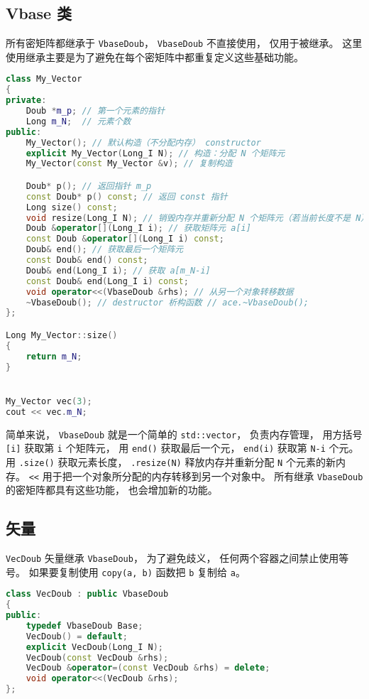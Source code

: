 \subsection{Vbase 类}
所有密矩阵都继承于 \verb|VbaseDoub|， \verb|VbaseDoub| 不直接使用， 仅用于被继承。 这里使用继承主要是为了避免在每个密矩阵中都重复定义这些基础功能。
\begin{lstlisting}[language=cpp]
class My_Vector
{
private:
    Doub *m_p; // 第一个元素的指针
    Long m_N;  // 元素个数
public:
    My_Vector(); // 默认构造（不分配内存） constructor
    explicit My_Vector(Long_I N); // 构造：分配 N 个矩阵元
    My_Vector(const My_Vector &v); // 复制构造

    Doub* p(); // 返回指针 m_p
    const Doub* p() const; // 返回 const 指针
    Long size() const;
    void resize(Long_I N); // 销毁内存并重新分配 N 个矩阵元（若当前长度不是 N）
    Doub &operator[](Long_I i); // 获取矩阵元 a[i]
    const Doub &operator[](Long_I i) const; 
    Doub& end(); // 获取最后一个矩阵元
    const Doub& end() const;
    Doub& end(Long_I i); // 获取 a[m_N-i]
    const Doub& end(Long_I i) const;
    void operator<<(VbaseDoub &rhs); // 从另一个对象转移数据
    ~VbaseDoub(); // destructor 析构函数 // ace.~VbaseDoub();
};

Long My_Vector::size()
{
    return m_N;
}


My_Vector vec(3);
cout << vec.m_N;
\end{lstlisting}

简单来说， \verb|VbaseDoub| 就是一个简单的 \verb|std::vector|， 负责内存管理， 用方括号 \verb|[i]| 获取第 \verb|i| 个矩阵元， 用 \verb|end()| 获取最后一个元， \verb|end(i)| 获取第 \verb|N-i| 个元。 用 \verb|.size()| 获取元素长度， \verb|.resize(N)| 释放内存并重新分配 \verb|N| 个元素的新内存。 \verb|<<| 用于把一个对象所分配的内存转移到另一个对象中。 所有继承 \verb|VbaseDoub| 的密矩阵都具有这些功能， 也会增加新的功能。

\subsection{矢量}
\verb|VecDoub| 矢量继承 \verb|VbaseDoub|， 为了避免歧义， 任何两个容器之间禁止使用等号。 如果要复制使用 \verb|copy(a, b)| 函数把 \verb|b| 复制给 \verb|a|。
\begin{lstlisting}[language=cpp]
class VecDoub : public VbaseDoub
{
public:
    typedef VbaseDoub Base;
    VecDoub() = default;
    explicit VecDoub(Long_I N);
    VecDoub(const VecDoub &rhs);
    VecDoub &operator=(const VecDoub &rhs) = delete;
    void operator<<(VecDoub &rhs);
};
\end{lstlisting}

